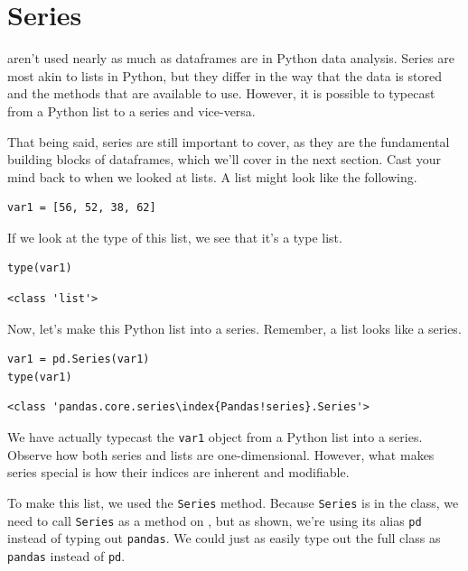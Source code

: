 \section{Series}
 aren't used nearly as much as dataframes are in Python data analysis. Series are most akin to lists in Python, but they differ in the way that the data is stored and the methods that are available to use. However, it is possible to typecast from a Python list to a  series and vice-versa.\par
That being said, series are still important to cover, as they are the fundamental building blocks of dataframes, which we'll cover in the next section. Cast your mind back to when we looked at lists. A list might look like the following.
\begin{lstlisting}[style=pippython]
var1 = [56, 52, 38, 62]
\end{lstlisting}
If we look at the type of this list, we see that it's a type list.
\begin{lstlisting}[style=pippython]
type(var1)
\end{lstlisting}
\begin{lstlisting}
<class 'list'>
\end{lstlisting}
Now, let's make this Python list into a  series. Remember, a list looks like a series.\par
\begin{lstlisting}[style=pippython]
var1 = pd.Series(var1)
type(var1)
\end{lstlisting}
\begin{lstlisting}
<class 'pandas.core.series\index{Pandas!series}.Series'>
\end{lstlisting}
We have actually typecast the \verb|var1| object from a Python list into a  series. Observe how both series and lists are one-dimensional. However, what makes series special is how their indices are inherent and modifiable.\par
To make this list, we used the  \verb|Series| method. Because \verb|Series| is in the  class, we need to call \verb|Series| as a method on , but as shown, we're using its alias \verb|pd| instead of typing out \verb|pandas|. We could just as easily type out the full class as \verb|pandas| instead of \verb|pd|.
